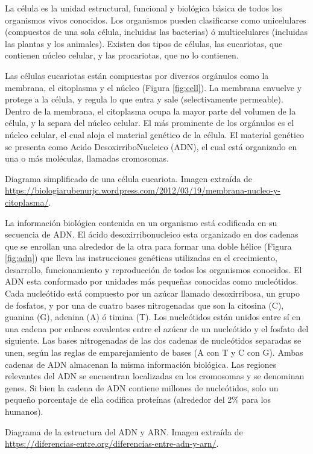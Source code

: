 \documentclass[12pt,twoside]{reedthesis}
\begin{document}
La célula es la unidad estructural, funcional y biológica básica de todos los organismos vivos conocidos. Los organismos pueden clasificarse como unicelulares (compuestos de una sola célula, incluidas las bacterias) ó multicelulares (incluidas las plantas y los animales). Existen dos tipos de células, las eucariotas, que contienen núcleo celular, y las procariotas, que no lo contienen.

Las células eucariotas están compuestas por diversos orgánulos como la membrana, el citoplasma y el núcleo (Figura \ref{fig:cell}). La membrana envuelve y protege a la célula, y regula lo que entra y sale (selectivamente permeable). Dentro de la membrana, el citoplasma ocupa la mayor parte del volumen de la célula, y la separa del núcleo celular. El más prominente de los orgánulos es el núcleo celular, el cual aloja el material genético de la célula. El material genético se presenta como Acido DesoxirriboNucleico (ADN), el cual está organizado en una o más moléculas, llamadas cromosomas.

Diagrama simplificado de una célula eucariota. Imagen extraída de \url{https://biologiarubenurjc.wordpress.com/2012/03/19/membrana-nucleo-y-citoplasma/}.



La información biológica contenida en un organismo está codificada en su secuencia de ADN. El ácido desoxirribonucleico esta organizado en dos cadenas que se enrollan una alrededor de la otra para formar una doble hélice (Figura \ref{fig:adn}) que lleva las instrucciones genéticas utilizadas en el crecimiento, desarrollo, funcionamiento y reproducción de todos los organismos conocidos. El ADN esta conformado por unidades más pequeñas conocidas como nucleótidos. Cada nucleótido está compuesto por un azúcar llamado desoxirribosa, un grupo de fosfatos, y por una de cuatro bases nitrogenadas que son la citosina (C), guanina (G), adenina (A) ó timina (T). Los nucleótidos están unidos entre sí en una cadena por enlaces covalentes entre el azúcar de un nucleótido y el fosfato del siguiente. Las bases nitrogenadas de las dos cadenas de nucleótidos separadas se unen, según las reglas de emparejamiento de bases (A con T y C con G). Ambas cadenas de ADN almacenan la misma información biológica. Las regiones relevantes del ADN se encuentran localizadas en los cromosomas y se denominan genes. Si bien la cadena de ADN contiene millones de nucleótidos, solo un pequeño porcentaje de ella codifica proteínas (alrededor del 2\% para los humanos).

Diagrama de la estructura del ADN y ARN. Imagen extraída de \url{https://diferencias-entre.org/diferencias-entre-adn-y-arn/}.
\end{document}
